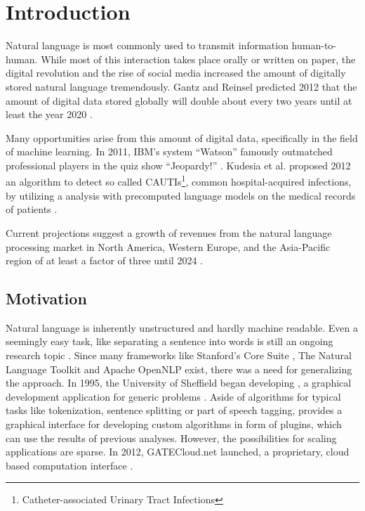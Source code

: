 
\chapter{Introduction}


Natural language is most commonly used to transmit information human-to-human. While most of this interaction takes place orally or written on paper, the digital revolution and the rise of social media increased the amount of digitally stored natural language tremendously. Gantz and Reinsel predicted 2012 that the amount of digital data stored globally will double about every two years until at least the year 2020 \cite{gantz2012digital}.

Many opportunities arise from this amount of digital data, specifically in the field of machine learning. In 2011, IBM's \qa{} system ``Watson'' famously outmatched professional players in the quiz show ``Jeopardy!'' \cite{ferrucci2012introduction,epstein2012making}. Kudesia et al. proposed 2012 an algorithm to detect so called CAUTIs\footnote{Catheter-associated Urinary Tract Infections}, common hospital-acquired infections, by utilizing a \nlp{} analysis with precomputed language models on the medical records of patients \cite{kudesia2012natural}.

Current projections suggest a growth of revenues from the natural language processing market in North America, Western Europe, and the Asia-Pacific region of at least a factor of three until 2024 \cite{stat:nlpeurope,stat:nlpamerica,stat:nlpasia}.

\section{Motivation}

Natural language is inherently unstructured and hardly machine readable. Even a seemingly easy task, like separating a sentence into words is still an ongoing research topic \cite{pak2018text}. Since many \nlp{} frameworks like Stanford's Core \nlp Suite \cite{manning-EtAl:2014:P14-5}, The Natural Language Toolkit \cite{bird2004nltk} and Apache OpenNLP \cite{opennlp} exist, there was a need for generalizing the \nlp{} approach. In 1995, the University of Sheffield began developing \nlpGate{}, a graphical development application for generic \nlp{} problems \cite{cunningham2002gate}. Aside of algorithms for typical \nlp{} tasks like tokenization, sentence splitting or part of speech tagging, \nlpGate{} provides a graphical interface for developing custom algorithms in form of plugins, which can use the results of previous \nlp{} analyses. However, the possibilities for scaling \nlpGate{} applications are sparse. In 2012, GATECloud.net launched, a proprietary, cloud based \nlpGate{} computation interface \cite{tablan2013gatecloud}. 


